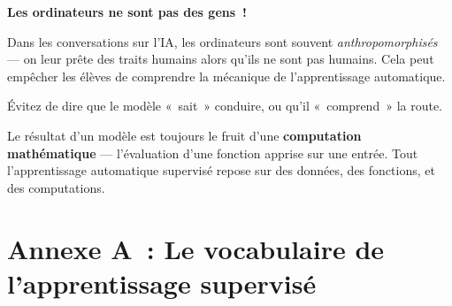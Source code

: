 \documentclass[12pt,a4paper]{article}
\begin{document}
\begin{keypointbox}
  \textbf{Les ordinateurs ne sont pas des gens~!}

  Dans les conversations sur l'IA, les ordinateurs sont souvent \emph{anthropomorphisés} — on leur prête des traits humains alors qu'ils ne sont pas humains. Cela peut empêcher les élèves de comprendre la mécanique de l'apprentissage automatique.

  Évitez de dire que le modèle «~sait~» conduire, ou qu'il «~comprend~» la route.

  Le résultat d'un modèle est toujours le fruit d'une \textbf{computation mathématique} — l'évaluation d'une fonction apprise sur une entrée. Tout l'apprentissage automatique supervisé repose sur des données, des fonctions, et des computations.
\end{keypointbox}

\newpage

\section*{Annexe A~: Le vocabulaire de l'apprentissage supervisé}
\end{document}
